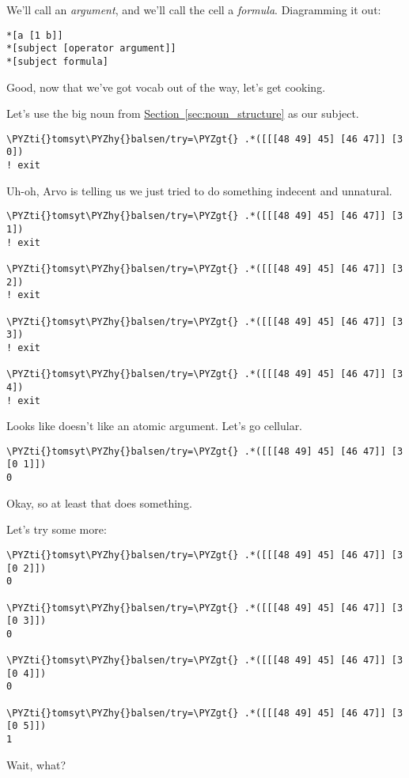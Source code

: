 We'll call  an \emph{argument}, and we'll call the cell \kode{[1 b]} a \emph{formula}.
Diagramming it out:
\begin{framed_shaded}
\begin{Verbatim}[fontsize=\relsize{-2.5},commandchars=\\\{\}]
*[a [1 b]]
*[subject [operator argument]]
*[subject formula]
\end{Verbatim}
\end{framed_shaded}
Good, now that we've got vocab out of the way, let's get cooking.

Let's use the big noun \kode{[[[48 49] 45] [46 47]]} from \hyperref[sec:noun_structure]{Section~\ref{sec:noun_structure}} as our subject.
\begin{framed_shaded}
\begin{Verbatim}[fontsize=\relsize{-2.5},commandchars=\\\{\}]
\PYZti{}tomsyt\PYZhy{}balsen/try=\PYZgt{} .*([[[48 49] 45] [46 47]] [3 0])
! exit
\end{Verbatim}
\end{framed_shaded}
Uh-oh, Arvo is telling us we just tried to do something indecent and unnatural.
\begin{framed_shaded}
\begin{Verbatim}[fontsize=\relsize{-2.5},commandchars=\\\{\}]
\PYZti{}tomsyt\PYZhy{}balsen/try=\PYZgt{} .*([[[48 49] 45] [46 47]] [3 1])
! exit

\PYZti{}tomsyt\PYZhy{}balsen/try=\PYZgt{} .*([[[48 49] 45] [46 47]] [3 2])
! exit

\PYZti{}tomsyt\PYZhy{}balsen/try=\PYZgt{} .*([[[48 49] 45] [46 47]] [3 3])
! exit

\PYZti{}tomsyt\PYZhy{}balsen/try=\PYZgt{} .*([[[48 49] 45] [46 47]] [3 4])
! exit
\end{Verbatim}
\end{framed_shaded}
Looks like  doesn't like an atomic argument. Let's go cellular.
\begin{framed_shaded}
\begin{Verbatim}[fontsize=\relsize{-2.5},commandchars=\\\{\}]
\PYZti{}tomsyt\PYZhy{}balsen/try=\PYZgt{} .*([[[48 49] 45] [46 47]] [3 [0 1]])
0
\end{Verbatim}
\end{framed_shaded}
Okay, so at least that does something.

Let's try some more:
\begin{framed_shaded}
\begin{Verbatim}[fontsize=\relsize{-2.5},commandchars=\\\{\}]
\PYZti{}tomsyt\PYZhy{}balsen/try=\PYZgt{} .*([[[48 49] 45] [46 47]] [3 [0 2]])
0

\PYZti{}tomsyt\PYZhy{}balsen/try=\PYZgt{} .*([[[48 49] 45] [46 47]] [3 [0 3]])
0

\PYZti{}tomsyt\PYZhy{}balsen/try=\PYZgt{} .*([[[48 49] 45] [46 47]] [3 [0 4]])
0

\PYZti{}tomsyt\PYZhy{}balsen/try=\PYZgt{} .*([[[48 49] 45] [46 47]] [3 [0 5]])
1
\end{Verbatim}
\end{framed_shaded}
Wait, what?

